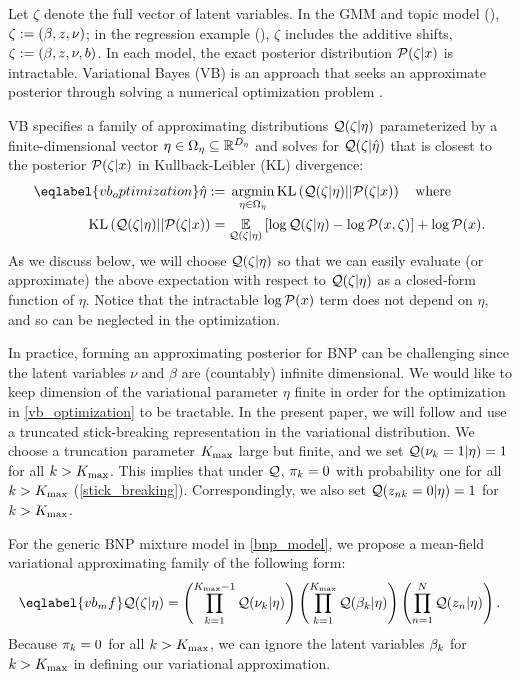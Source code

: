 Let $\zeta$ denote the full vector of
latent variables.
In the GMM and topic model (),
$\zeta := (\beta, z, \nu)$;
in the regression example (),
$\zeta$ includes the additive shifts, $\zeta := (\beta, z, \nu, b)$.
In each model,
the exact posterior distribution $\mathcal{P}(\zeta \vert x)$
is intractable.
Variational Bayes (VB) is an approach that seeks an approximate posterior
through solving a numerical optimization problem
\citep{jordan:1999:vi, wainwright:2008:graphical_models, blei:2017:vi_review}.

VB specifies a
family of approximating distributions $\mathcal{Q}(\zeta \vert \eta)$
parameterized by a finite-dimensional vector $\eta \in \Omega_{\eta} \subseteq
\mathbb{R}^{{D_{\eta}}}$
and solves for $\mathcal{Q}(\zeta\vert\hat\eta)$
that is closest to the posterior $\mathcal{P}(\zeta \vert x)$ in
Kullback-Leibler (KL) divergence:
%
\begin{align}\eqlabel{vb_optimization}
%
\etaopt :={}&
    \argmin_{\eta \in \etadom}
        \KL{\q(\zeta \vert \eta) || \p(\zeta \vert \x)} \mathwhere \\
\KL{\q(\zeta \vert \eta) || \p(\zeta \vert \x)}
={}&    \expect{\q(\zeta \vert \eta)}{
        \log \q(\zeta \vert \eta) - \logp(\x, \zeta)} + \logp(\x). \nonumber
%
\end{align}
%
As we discuss
below, we will choose $\mathcal{Q}(\zeta \vert \eta)$ so that we can easily evaluate (or approximate)
the above expectation with respect to $\mathcal{Q}(\zeta \vert \eta)$
as a closed-form function of $\eta$.
Notice that the intractable $\log \mathcal{P}(x)$ term does not depend on $\eta$, and
so can be neglected in the optimization.

In practice, forming an approximating posterior for BNP
can be challenging since the latent variables $\nu$ and $\beta$ are
(countably) infinite dimensional.
We would like to keep dimension of the variational parameter $\eta$ finite
in order for the optimization in \eqref{vb_optimization} to be tractable.
In the present paper, we will follow \citet{blei:2006:vi_for_dp} and
use a truncated stick-breaking representation in
the variational distribution.
We choose a truncation parameter ${K_{\mathrm{max}}}$ large but finite,
and we set $\mathcal{Q}(\nu_k = 1 | \eta) = 1$ for all $k > {K_{\mathrm{max}}}$.
This implies that under $\mathcal{Q}$, $\pi_k = 0$ with probability one
for all $k > {K_{\mathrm{max}}}$
(\eqref{stick_breaking}).
Correspondingly, we also set $\mathcal{Q}(z_{nk} = 0 | \eta) = 1$ for $k > {K_{\mathrm{max}}}$.

For the generic BNP mixture model in \eqref{bnp_model},
we propose a mean-field variational approximating family of the following form:
%
\begin{align}\eqlabel{vb_mf}
%
\q(\zeta \vert \eta) =
    \left( \prod_{\k=1}^{\kmax - 1} \q(\nuk \vert \eta) \right)
    \left( \prod_{\k=1}^{\kmax} \q(\beta_\k \vert \eta) \right)
    \left( \prod_{\n=1}^{\N} \q(\z_{\n} \vert \eta) \right).
%
\end{align}
Because $\pi_k = 0$ for all $k > {K_{\mathrm{max}}}$,
we can ignore the latent variables $\beta_k$ for $k > {K_{\mathrm{max}}}$ in
defining our variational approximation.

